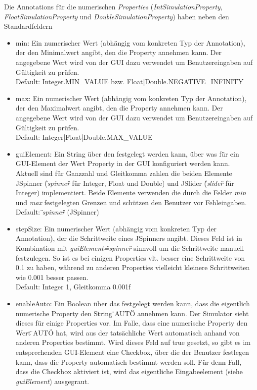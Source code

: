 \documentclass[a4paper, 11pt]{article} %
\begin{document}
Die Annotations für die numerischen \emph{Properties} (\emph{IntSimulationProperty}, \emph{FloatSimulationProperty} und \emph{DoubleSimulationProperty}) haben neben den Standardfeldern  
\begin{itemize}
	\item min: Ein numerischer Wert (abhängig vom konkreten Typ der Annotation), der den Minimalwert angibt, den die Property annehmen kann. Der angegebene Wert wird von der GUI dazu verwendet um Benutzereingaben auf Gültigkeit zu prüfen.\\
	Default: Integer.MIN\_VALUE bzw. Float|Double.NEGATIVE\_INFINITY
	\item max: Ein numerischer Wert (abhängig vom konkreten Typ der Annotation), der den Maximalwert angibt, den die Property annehmen kann. Der angegebene Wert wird von der GUI dazu verwendet um Benutzereingaben auf Gültigkeit zu prüfen.\\
	Default: Integer|Float|Double.MAX\_VALUE
	\item guiElement: Ein String über den festgelegt werden kann, über was für ein GUI-Element der Wert Property in der GUI konfiguriert werden kann. Aktuell sind für Ganzzahl und Gleitkomma zahlen die beiden Elemente JSpinner (\emph{\"{}spinner\"{}} für Integer, Float und Double) und JSlider (\emph{\"{}slider\"{}} für Integer) implementiert. Beide Elemente verwenden die durch die Felder \emph{min} und \emph{max} festgelegten Grenzen und schützen den Benutzer vor Fehleingaben.\\
	Default: \emph{\"{}spinner\"{}} (JSpinner)
	\item stepSize: Ein numerischer Wert (abhängig vom konkreten Typ der Annotation), der die Schrittweite eines JSpinners angibt. Dieses Feld ist in Kombination mit \emph{guiElement=\"{}spinner\"{}} sinnvoll um die Schrittweite manuell festzulegen. So ist es bei einigen Properties vlt. besser eine Schrittweite von 0.1 zu haben, während zu anderen Properties vielleicht kleinere Schrittweiten wie 0.001 besser passen.\\
	Default: Integer 1, Gleitkomma 0.001f
	\item enableAuto: Ein Boolean über das festgelegt werden kann, dass die eigentlich numerische Property den String \"{}AUTO\"{} annehmen kann. Der Simulator sieht dieses für einige Properties vor. Im Falle, dass eine numerische Property den Wert \"{}AUTO\"{} hat, wird aus der tatsächliche Wert automatisch anhand von anderen Properties bestimmt. Wird dieses Feld auf true gesetzt, so gibt es im entsprechenden GUI-Element eine Checkbox, über die der Benutzer festlegen kann, dass die Property automatisch bestimmt werden soll. Für denn Fall, dass  die Checkbox aktiviert ist, wird das eigentliche Eingabeelement (siehe \emph{guiElement}) ausgegraut.\\

\end{itemize}
\end{document}

